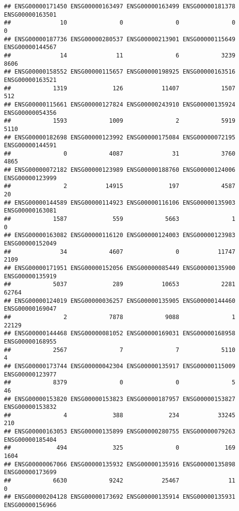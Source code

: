 \documentclass[
]{article}
\begin{document}
\begin{verbatim}
## ENSG00000171450 ENSG00000163497 ENSG00000163499 ENSG00000181378 ENSG00000163501 
##              10               0               0               0               0 
## ENSG00000187736 ENSG00000280537 ENSG00000213901 ENSG00000115649 ENSG00000144567 
##              14              11               6            3239            8606 
## ENSG00000158552 ENSG00000115657 ENSG00000198925 ENSG00000163516 ENSG00000163521 
##            1319             126           11407            1507             512 
## ENSG00000115661 ENSG00000127824 ENSG00000243910 ENSG00000135924 ENSG00000054356 
##            1593            1009               2            5919            5110 
## ENSG00000182698 ENSG00000123992 ENSG00000175084 ENSG00000072195 ENSG00000144591 
##               0            4087              31            3760            4865 
## ENSG00000072182 ENSG00000123989 ENSG00000188760 ENSG00000124006 ENSG00000123999 
##               2           14915             197            4587              20 
## ENSG00000144589 ENSG00000114923 ENSG00000116106 ENSG00000135903 ENSG00000163081 
##            1587             559            5663               1               0 
## ENSG00000163082 ENSG00000116120 ENSG00000124003 ENSG00000123983 ENSG00000152049 
##              34            4607               0           11747            2109 
## ENSG00000171951 ENSG00000152056 ENSG00000085449 ENSG00000135900 ENSG00000135919 
##            5037             289           10653            2281           62764 
## ENSG00000124019 ENSG00000036257 ENSG00000135905 ENSG00000144460 ENSG00000169047 
##               2            7878            9088               1           22129 
## ENSG00000144468 ENSG00000081052 ENSG00000169031 ENSG00000168958 ENSG00000168955 
##            2567               7               7            5110               4 
## ENSG00000173744 ENSG00000042304 ENSG00000135917 ENSG00000115009 ENSG00000123977 
##            8379               0               0               5              46 
## ENSG00000153820 ENSG00000153823 ENSG00000187957 ENSG00000153827 ENSG00000153832 
##               4             388             234           33245             210 
## ENSG00000163053 ENSG00000135899 ENSG00000280755 ENSG00000079263 ENSG00000185404 
##             494             325               0             169            1604 
## ENSG00000067066 ENSG00000135932 ENSG00000135916 ENSG00000135898 ENSG00000173699 
##            6630            9242           25467              11               0 
## ENSG00000204128 ENSG00000173692 ENSG00000135914 ENSG00000135931 ENSG00000156966 

\end{verbatim}
\end{document}

